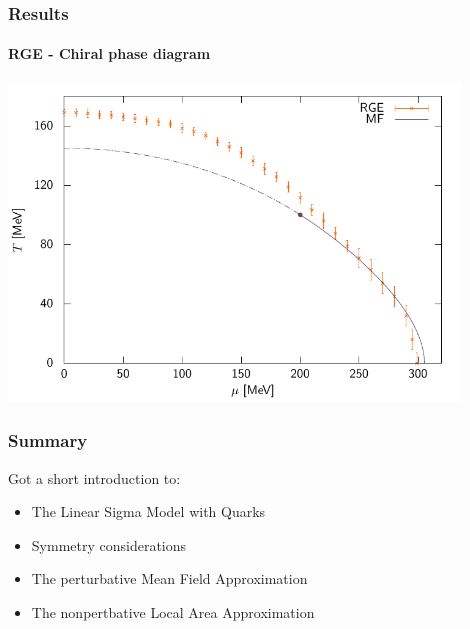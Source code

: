 \documentclass[10pt,a4paper,usenames,dvipsnames]{beamer}
\begin{document}
\begin{frame}
  \frametitle{Results}
  \framesubtitle{RGE - Chiral phase diagram}

  {\centering
    \includegraphics[width=0.9\textwidth]{Plots/rgediag.pdf}
   \par}
\end{frame}

\begin{frame}
  \frametitle{Summary}

  Got a short introduction to:
  \begin{itemize}
    \item The Linear Sigma Model with Quarks
    \item Symmetry considerations
    \item The perturbative Mean Field Approximation
    \item The nonpertbative Local Area Approximation
  \end{itemize}

\end{frame}
\end{document}
